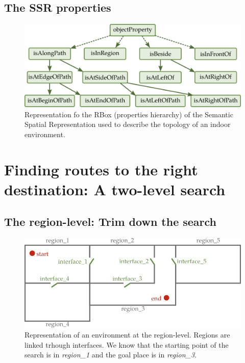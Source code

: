 \subsection{The SSR properties}

\begin{figure}[ht!]
\centering
\includegraphics[scale=0.4]{figures/chapter3/ssr_rbox.png}
\caption{\label{fig:chap3_rbox} Representation fo the RBox (properties hierarchy) of the Semantic Spatial Representation used to describe the topology of an indoor environment.}
\end{figure}


\section{Finding routes to the right destination: A two-level search}

\subsection{The region-level: Trim down the search}

\begin{figure}[ht!]
\centering
\includegraphics[scale=0.55]{figures/chapter3/regions.png}
\caption{\label{fig:chap3_regions} Representation of an environment at the region-level. Regions are linked trhough interfaces. We know that the starting point of the search is in \textit{region\_1} and the goal place is in \textit{region\_3}. }
\end{figure}


